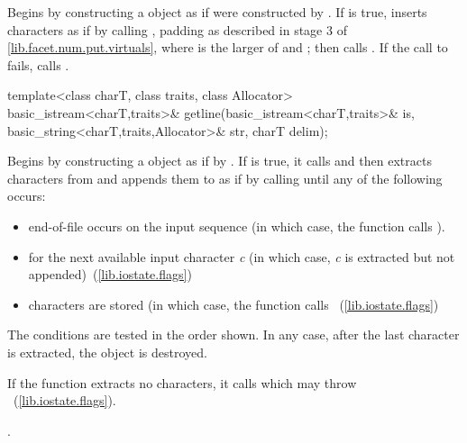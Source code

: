 \begin{itemdescr}
\pnum
\effects
Begins by constructing a  object  as if 
were constructed by .
If  is true, inserts characters as if by calling
, padding as described in stage 3
of \ref{lib.facet.num.put.virtuals}, where  is the larger of
 and ;
then calls
.
If the call to  fails,
calls .

\pnum
\returns
{}
\end{itemdescr}

%
%
\begin{itemdecl}
template<class charT, class traits, class Allocator>
  basic_istream<charT,traits>&
    getline(basic_istream<charT,traits>& is,
            basic_string<charT,traits,Allocator>& str,
            charT delim);
\end{itemdecl}

\begin{itemdescr}
\pnum
\effects
Begins by constructing a  object  as if by
.
If  is true, it calls 
and then extracts characters from  and appends them
to  as if by calling
until any of the following occurs:

\begin{itemize}
\item
end-of-file occurs on the input sequence (in which case, the 
function calls ).
\item
{} for the next available input character \textit{c}
(in which case, \textit{c}
is extracted but not appended)~(\ref{lib.iostate.flags})
\item
{} characters are stored (in which case, the function calls
~(\ref{lib.iostate.flags})
\end{itemize}

\pnum
The conditions are tested in the order shown. In any case,
after the last character is extracted, the  object 
is destroyed.

\pnum
If the function extracts no characters, it calls
which may throw
~(\ref{lib.iostate.flags}).

\pnum
\returns
{}.
\end{itemdescr}

